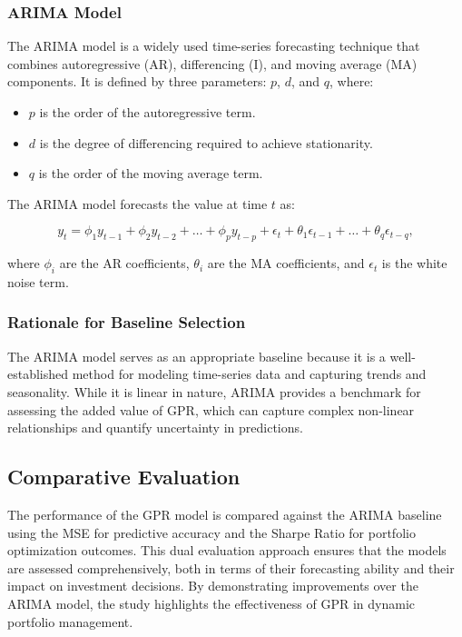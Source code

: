 \subsubsection{\ac{ARIMA} Model}

The \ac{ARIMA} model is a widely used time-series forecasting technique that combines autoregressive (AR), differencing (I), and moving average (MA) components. It is defined by three parameters: $p$, $d$, and $q$, where:

\begin{itemize}
    \item $p$ is the order of the autoregressive term.
    \item $d$ is the degree of differencing required to achieve stationarity.
    \item $q$ is the order of the moving average term.
\end{itemize}

The \ac{ARIMA} model forecasts the value at time $t$ as:

\begin{equation}
y_t = \phi_1 y_{t-1} + \phi_2 y_{t-2} + \dots + \phi_p y_{t-p} + \epsilon_t + \theta_1 \epsilon_{t-1} + \dots + \theta_q \epsilon_{t-q},
\end{equation}

where $\phi_i$ are the AR coefficients, $\theta_i$ are the MA coefficients, and $\epsilon_t$ is the white noise term.

\subsubsection{Rationale for Baseline Selection}

The \ac{ARIMA} model serves as an appropriate baseline because it is a well-established method for modeling time-series data and capturing trends and seasonality. While it is linear in nature, ARIMA provides a benchmark for assessing the added value of GPR, which can capture complex non-linear relationships and quantify uncertainty in predictions.

\subsection{Comparative Evaluation}

The performance of the \ac{GPR} model is compared against the \ac{ARIMA} baseline using the \ac{MSE} for predictive accuracy and the Sharpe Ratio for portfolio optimization outcomes. This dual evaluation approach ensures that the models are assessed comprehensively, both in terms of their forecasting ability and their impact on investment decisions. By demonstrating improvements over the \ac{ARIMA} model, the study highlights the effectiveness of \ac{GPR} in dynamic portfolio management.

